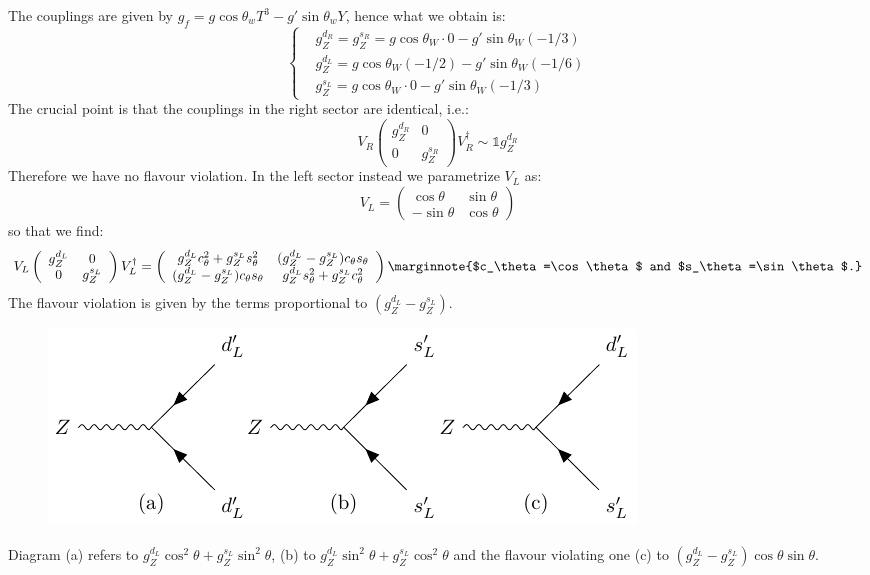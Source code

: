 \documentclass[../main.tex]{subfiles}
\begin{document}
The couplings are given by $g_f=g\cos\theta_wT^3-g'\sin\theta_wY$, hence what we obtain is:
\[
\left\{
\begin{aligned}
&g_Z^{d_R}=g_Z^{s_R}=g\cos\theta_W\cdot0-g'\sin\theta_W(-1/3)\\
&g_Z^{d_L}=g\cos\theta_W(-1/2)-g'\sin\theta_W(-1/6)\\
&g_Z^{s_L}=g\cos\theta_W\cdot0-g'\sin\theta_W(-1/3)
\end{aligned}
\right.
\]
The crucial point is that the couplings in the right sector are identical, i.e.: 
\[
V_R\left(\begin{array}{cc}
    g_Z^{d_R} & 0 \\
    0 & g_Z^{s_R}
\end{array}\right)V_R^\dagger\sim\mathbb{1}g_Z^{d_R}
\]
Therefore we have no flavour violation. In the left sector instead we parametrize $V_L$ as:
\[
V_L=\left(\begin{array}{cc}
    \cos\theta & \sin\theta \\
    -\sin\theta & \cos\theta
\end{array}\right)
\]
so that we find:
\[
V_L\left(\begin{array}{cc}
    g_Z^{d_L} & 0 \\
    0 & g_Z^{s_L}
\end{array}\right)V_L^\dagger=\left(\begin{array}{cc}
    g_Z^{d_L}c^2 _\theta+g_Z^{s_L}s^2 _\theta & (g_Z^{d_L}-g_Z^{s_L})c _\theta s _\theta \\
    (g_Z^{d_L}-g_Z^{s_L})c _\theta s _\theta & g_Z^{d_L}s^2 _\theta+g_Z^{s_L}c^2 _\theta
\end{array}\right)\marginnote{$c_\theta=\cos\theta$ and $s_\theta=\sin\theta$.}
\]
The flavour violation is given by the terms proportional to $(g_Z^{d_L}-g_Z^{s_L})$.
\begin{figure}[h]
    \centering
    \includegraphics{Images/feynmanabc.pdf}
    \caption*{}
\end{figure}
Diagram (a) refers to $g_Z^{d_L}\cos^2\theta+g_Z^{s_L}\sin^2\theta$, (b) to $g_Z^{d_L}\sin^2\theta+g_Z^{s_L}\cos^2\theta$ and the flavour violating one (c) to $(g_Z^{d_L}-g_Z^{s_L})\cos\theta\sin\theta$.\\ 
\end{document}
